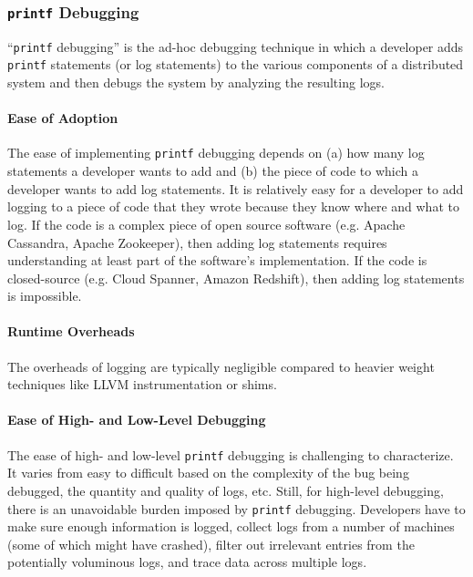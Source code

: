 \newcommand{\printf}{\texttt{printf}}
\subsubsection{\printf{} Debugging}
``\printf{} debugging'' is the ad-hoc debugging technique in which a developer
adds \printf{} statements (or log statements) to the various components of a
distributed system and then debugs the system by analyzing the resulting logs.

\paragraph{Ease of Adoption}
The ease of implementing \printf{} debugging depends on (a) how many log
statements a developer wants to add and (b) the piece of code to which a
developer wants to add log statements. It is relatively easy for a developer to
add logging to a piece of code that they wrote because they know where and what
to log. If the code is a complex piece of open source software (e.g. Apache
Cassandra, Apache Zookeeper), then adding log statements requires understanding
at least part of the software's implementation. If the code is closed-source
(e.g. Cloud Spanner, Amazon Redshift), then adding log statements is
impossible.

\paragraph{Runtime Overheads}
The overheads of logging are typically negligible compared to heavier weight
techniques like LLVM instrumentation or \fluent{} shims.

\paragraph{Ease of High- and Low-Level Debugging}
The ease of high- and low-level \printf{} debugging is challenging to
characterize. It varies from easy to difficult based on the complexity of the
bug being debugged, the quantity and quality of logs, etc. Still, for
high-level debugging, there is an unavoidable burden imposed by \printf{}
debugging. Developers have to make sure enough information is logged, collect
logs from a number of machines (some of which might have crashed), filter out
irrelevant entries from the potentially voluminous logs, and trace data across
multiple logs.

\subsubsection{\fluent{}}
